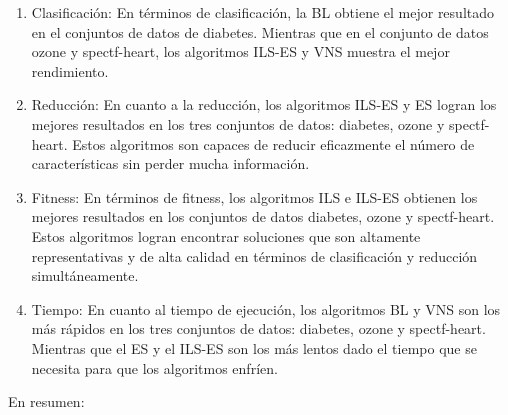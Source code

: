 \begin{enumerate}
\item Clasificación: En términos de clasificación, la BL obtiene el mejor resultado en el conjuntos de datos de diabetes. Mientras que en el conjunto de datos ozone y spectf-heart, los algoritmos ILS-ES y VNS muestra el mejor rendimiento.

\item Reducción: En cuanto a la reducción, los algoritmos ILS-ES y ES logran los mejores resultados en los tres conjuntos de datos: diabetes, ozone y spectf-heart. Estos algoritmos son capaces de reducir eficazmente el número de características sin perder mucha información.

\item Fitness: En términos de fitness, los algoritmos ILS e ILS-ES obtienen los mejores resultados en los conjuntos de datos diabetes, ozone y spectf-heart.  Estos algoritmos logran encontrar soluciones que son altamente representativas y de alta calidad en términos de clasificación y reducción simultáneamente.

\item Tiempo: En cuanto al tiempo de ejecución, los algoritmos BL y VNS son los más rápidos en los tres conjuntos de datos: diabetes, ozone y spectf-heart. Mientras que el ES y el ILS-ES son los más lentos dado el tiempo que se necesita para que los algoritmos enfríen.

\end{enumerate}

En resumen:

